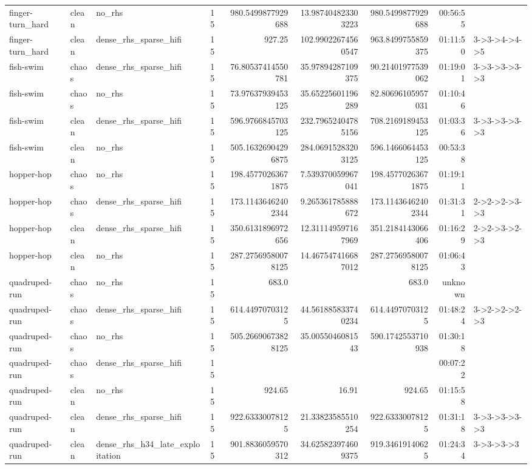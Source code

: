 \begin{tabular}{llllrrrrl}
finger-turn\_hard & clean & no\_rhs & 15 & 980.5499877929688 & 13.987404823303223 & 980.5499877929688 & 00:56:55 &  \\
finger-turn\_hard & clean & dense\_rhs\_sparse\_hifi & 15 & 927.25 & 102.99022674560547 & 963.8499755859375 & 01:11:50 & 3->3->4->4->5 \\
fish-swim & chaos & dense\_rhs\_sparse\_hifi & 15 & 76.80537414550781 & 35.97894287109375 & 90.21401977539062 & 01:19:01 & 3->3->3->3->3 \\
fish-swim & chaos & no\_rhs & 15 & 73.97637939453125 & 35.65225601196289 & 82.80696105957031 & 01:10:46 &  \\
fish-swim & clean & dense\_rhs\_sparse\_hifi & 15 & 596.9766845703125 & 232.79652404785156 & 708.2169189453125 & 01:03:36 & 3->3->3->3->3 \\
fish-swim & clean & no\_rhs & 15 & 505.16326904296875 & 284.06915283203125 & 596.1466064453125 & 00:53:38 &  \\
hopper-hop & chaos & no\_rhs & 15 & 198.45770263671875 & 7.539370059967041 & 198.45770263671875 & 01:19:11 &  \\
hopper-hop & chaos & dense\_rhs\_sparse\_hifi & 15 & 173.11436462402344 & 9.265361785888672 & 173.11436462402344 & 01:31:31 & 2->2->2->3->3 \\
hopper-hop & clean & dense\_rhs\_sparse\_hifi & 15 & 350.6131896972656 & 12.311149597167969 & 351.2184143066406 & 01:16:29 & 2->2->3->2->3 \\
hopper-hop & clean & no\_rhs & 15 & 287.27569580078125 & 14.467547416687012 & 287.27569580078125 & 01:06:43 &  \\
quadruped-run & chaos & no\_rhs & 15 & 683.0 &  & 683.0 & unknown &  \\
quadruped-run & chaos & dense\_rhs\_sparse\_hifi & 15 & 614.44970703125 & 44.561885833740234 & 614.44970703125 & 01:48:24 & 3->2->2->2->3 \\
quadruped-run & chaos & no\_rhs & 15 & 505.26690673828125 & 35.0055046081543 & 590.1742553710938 & 01:30:18 &  \\
quadruped-run & chaos & dense\_rhs\_sparse\_hifi & 15 &  &  &  & 00:07:22 &  \\
quadruped-run & clean & no\_rhs & 15 & 924.65 & 16.91 & 924.65 & 01:15:58 &  \\
quadruped-run & clean & dense\_rhs\_sparse\_hifi & 15 & 922.63330078125 & 21.33823585510254 & 922.63330078125 & 01:31:18 & 3->3->3->3->3 \\
quadruped-run & clean & dense\_rhs\_h34\_late\_exploitation & 15 & 901.8836059570312 & 34.625823974609375 & 919.34619140625 & 01:24:34 & 3->3->3->3 \\

\end{tabular}
